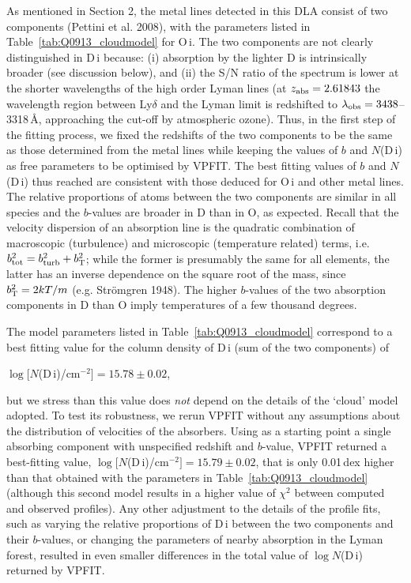 \documentclass[useAMS,usenatbib]{mn2e}
\begin{document}
As mentioned in Section 2, the metal lines detected in this DLA
consist of two components (Pettini et al. 2008),
with the parameters listed in Table~\ref{tab:Q0913_cloudmodel}
for O\,{\sc i}. The two components are not clearly distinguished
in D\,{\sc i} because: (i) absorption by the lighter D is intrinsically
broader (see discussion below),  and (ii) the S/N ratio of the
spectrum is lower at the shorter wavelengths of the high
order Lyman lines (at $z_{\rm abs} = 2.61843$
the wavelength region between Ly$\delta$ and the Lyman limit
is redshifted to $\lambda_{\rm obs} = 3438$--3318\,\AA,
approaching the cut-off by atmospheric ozone).
Thus, in the first step of the fitting process, we fixed the redshifts of the two
components to be the same as those determined from the metal lines
while keeping the values of $b$ and $N$(D\,{\sc i}) as free parameters
to be optimised by VPFIT.
The best fitting values of  $b$ and $N$(D\,{\sc i}) thus reached
are consistent with those deduced for O\,{\sc i} and other
metal lines. The relative
proportions of atoms between the two components are similar
in all species and the $b$-values are broader in D than in O,
as expected. Recall that the velocity dispersion of an
absorption line is the quadratic combination of macroscopic
(turbulence) and microscopic (temperature related) terms,
i.e. $b_{\rm tot}^2 = b_{\rm turb}^2 + b_{\rm T}^2$;
while the former is presumably  the same for all elements,
the latter has an inverse dependence on the square root of the
mass, since $b_{\rm T}^2 = 2kT/m$ (e.g. Str{\"o}mgren 1948).
The higher $b$-values of the two absorption components
in D than O imply temperatures of a few
thousand degrees.

The model parameters listed in Table~\ref{tab:Q0913_cloudmodel}
correspond to a best fitting value for the column density
of D\,{\sc i} (sum of the two components) of
\begin{center}
$\log [N$(D\,{\sc i})/cm$^{-2}] = 15.78\pm 0.02$,
\end{center}
but we
stress than this value does \emph{not} depend on the details of
the `cloud' model adopted. To test its robustness,
we rerun VPFIT without  any assumptions
about the distribution of velocities of the absorbers.
Using as a starting point a
single absorbing component with unspecified redshift
and $b$-value, VPFIT returned a best-fitting value,
$\log [N$(D\,{\sc i})/cm$^{-2}] = 15.79\pm 0.02$,
that is only 0.01\,dex higher than that obtained
with the parameters in Table~\ref{tab:Q0913_cloudmodel}
(although this second model results in a higher value of $\chi^2$
between computed and observed profiles).
Any other adjustment to the details of the profile
fits, such as varying the relative proportions of D\,{\sc i}
between the two components and their $b$-values,
or changing the parameters of nearby absorption in the
Lyman forest, resulted in even smaller differences in
the total value of $\log N$(D\,{\sc i}) returned by VPFIT.
\end{document}
